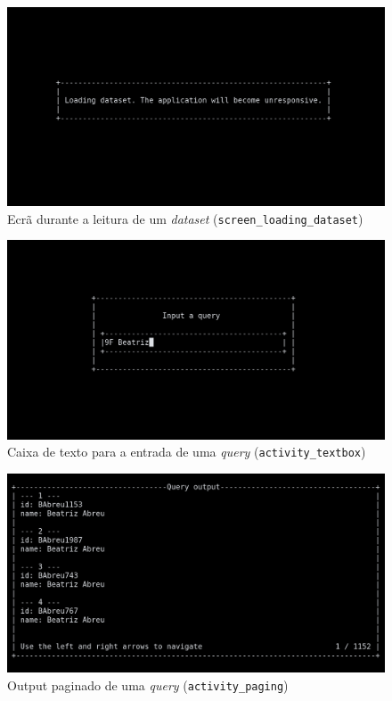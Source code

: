 \documentclass[11pt, a4paper]{article}
\begin{document}
\begin{figure}[H]
    \centering
    \includegraphics[scale=0.25]{res-fase2/interactive_screenshots/loading_dataset.png}
    \caption{Ecrã durante a leitura de um \emph{dataset} (\texttt{screen\_loading\_dataset})}
    \label{fig:loading_dataset}
\end{figure}

\begin{figure}[H]
    \centering
    \includegraphics[scale=0.25]{res-fase2/interactive_screenshots/textbox.png}
    \caption{Caixa de texto para a entrada de uma \emph{query} (\texttt{activity\_textbox})}
    \label{fig:textbox}
\end{figure}

\begin{figure}[H]
    \centering
    \includegraphics[scale=0.25]{res-fase2/interactive_screenshots/paging.png}
    \caption{Output paginado de uma \emph{query} (\texttt{activity\_paging})}
    \label{fig:paging}
\end{figure}
\end{document}
